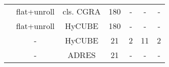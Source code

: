 \begin{table}
{\begin{tabular}{|l|c|c|c|c|c|c|}
 \rowcolor{darkRed!50}{Morpher}                       & {flat+unroll}                        & cls. CGRA                            & 180                           & -                          & -                                   & -\\
 \rowcolor{darkRed!50}{Morpher}                       & {flat+unroll}                        & HyCUBE                               & 180                           & -                          & -                                   & -\\ 
 \rowcolor{darkOrange!50}{CGRA-ME}                    & {-}                                  & HyCUBE                               & 21                            & 2                          & 11                                  & 2 \\
 \rowcolor{darkRed!50}{Pillars}                       & {-}                                  & ADRES                                & 21                            & -                          & -                                   & - \\ \hline
        \end{tabular}
    }
    \vspace{-1.5em}
\end{table}
